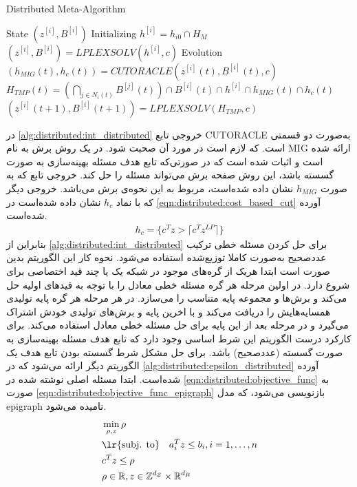 \begin{latin}
	\begin{algorithm}
		\caption{Distributed Meta-Algorithm}
		\label{alg:distributed:int_distributed}
		\begin{algorithmic}[1]
			\Statex State $(z^{[i]},B^{[i]})$
			\Statex Initializing    
			\State $h^{[i]} = h_{i0} \cap H_M$
			\State $(z^{[i]},B^{[i]}) = LPLEXSOLV(h^{[i]}, c)$
			\Statex Evolution 
			\State $(h_{MIG}(t),h_c(t)) = CUTORACLE(z^{[i]}(t),B^{[i]}(t),c)$
			\State $\displaystyle H_{TMP}(t) = (\bigcap_{j \in N_i(t)}B^{[j]}(t)) \cap B^{[i]}(t) \cap h^{[i]} \cap h_{MIG}(t) \cap h_c(t)$
			\State $(z^{[i]}(t+1),B^{[i]}(t+1)) = LPLEXSOLV(H_{TMP}, c)$
		\end{algorithmic}
	\end{algorithm}
\end{latin}
در \cref{alg:distributed:int_distributed} خروجی تابع CUTORACLE به‌صورت دو قسمتی است. که لازم است در مورد آن صحبت شود. در \cite{gomory1960algorithm} یک روش برش به نام MIG ارائه شده است و اثبات شده است که در صورتی‌که تابع هدف مسئله بهینه‌سازی به صورت گسسته باشد، این روش صفحه برش می‌تواند مسئله را حل کند. خروجی تابع که به صورت $h_{MIG}$ نشان داده شده‌است، مربوط به این نحوه‌ی برش می‌باشد. خروجی دیگر که با نماد $h_c$ نشان داده شده‌است در \cref{eqn:distributed:cost_based_cut} آورده شده‌است. 
\begin{align}\label{eqn:distributed:cost_based_cut}
	h_c = \{ c^Tz > \lceil c^Tz^{LP}\rceil \}	
\end{align}
	بنابراین از \cref{alg:distributed:int_distributed} برای حل کردن مسئله خطی ترکیب عددصحیح به‌صورت کاملا توزیع‌شده استفاده می‌شود. نحوه کار این الگوریتم بدین صورت است ابتدا هریک از گره‌های موجود در شبکه یک یا چند قید اختصاصی برای شروع دارد. در اولین مرحله هر گره مسئله خطی معادل را با توجه به قیدهای اولیه حل می‌کند و برش‌ها و مجموعه پایه متناسب را می‌سازد. در هر مرحله هر گره پایه تولیدی همسایه‌هایش را دریافت می‌کند و با اخرین پایه و برش‌های تولیدی خودش اشتراک می‌گیرد و در مرحله بعد از این پایه برای حل مسئله خطی معادل استفاده می‌کند. برای کارکرد درست الگوریتم این شرط اساسی وجود دارد که تابع هدف مسئله بهینه‌سازی به صورت گسسته (عددصحیح) باشد. 
	برای حل مشکل شرط گسسته بودن تابع هدف یک الگوریتم دیگر ارائه می‌شود که در \cref{alg:distributed:epsilon_distributed} آورده شده‌است. ابتدا مسئله اصلی نوشته شده در \cref{eqn:distributed:objective_func} به صورت \cref{eqn:distributed:objective_func_epigraph} بازنویسی می‌شود، که مدل epigraph نامیده می‌شود. 
	\begin{subequations}\label{eqn:distributed:objective_func_epigraph}
		\begin{align}
		&\min_{\rho,z}\rho \\
		&\text{\lr{subj. to}} \quad a_i^Tz \le b_i, i = 1, \dots, n  \\
		&c^Tz \le \rho \\
		&\rho \in \mathbb{R}, z \in \mathbb{Z}^{d_Z} \times \mathbb{R}^{d_R} \\
		\end{align}
	\end{subequations}
